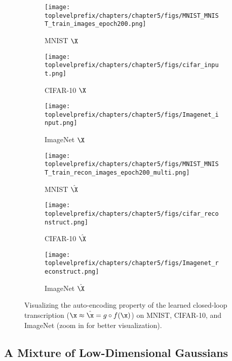 \documentclass[../../book-main.tex]{subfiles}
\begin{document}
\begin{figure}[t]
    \begin{subfigure}[t]{0.3\textwidth}
        \centering
        \texttt{[image: \\toplevelprefix/chapters/chapter5/figs/MNIST\_MNIST\_train\_images\_epoch200.png]}
        \caption{{\small MNIST $\X$}}
    \end{subfigure}
    \hfill
    \begin{subfigure}[t]{0.3\textwidth}
        \centering
        \texttt{[image: \\toplevelprefix/chapters/chapter5/figs/cifar\_input.png]}
        \caption{{\small CIFAR-10 $\X$}}
    \end{subfigure}
    \hfill
    \begin{subfigure}[t]{0.3\textwidth}
        \centering
        \texttt{[image: \\toplevelprefix/chapters/chapter5/figs/Imagenet\_input.png]}
        \caption{{\small ImageNet $\X$}}
    \end{subfigure}

    \begin{subfigure}[t]{0.3\textwidth}
        \centering
        \texttt{[image: \\toplevelprefix/chapters/chapter5/figs/MNIST\_MNIST\_train\_recon\_images\_epoch200\_multi.png]}
        \caption{{\small MNIST $\hat{\X}$}}
    \end{subfigure}
    \hfill
    \begin{subfigure}[t]{0.3\textwidth}
        \centering
        \texttt{[image: \\toplevelprefix/chapters/chapter5/figs/cifar\_reconstruct.png]}
        \caption{{\small CIFAR-10 $\hat{\X}$}}
    \end{subfigure}
    \hfill
    \begin{subfigure}[t]{0.3\textwidth}
        \centering
        \texttt{[image: \\toplevelprefix/chapters/chapter5/figs/Imagenet\_reconstruct.png]}
        \caption{{\small ImageNet $\hat{\X}$}}
    \end{subfigure}
    \caption{Visualizing the auto-encoding property of the learned closed-loop transcription \mbox{($\x \approx \hat{\x} = g\circ f(\x)$)} on MNIST, CIFAR-10, and ImageNet (zoom in for better visualization).}
    \label{fig:justify_xhat_equals_x}
\end{figure}
     

\subsection{A Mixture of Low-Dimensional Gaussians}
\end{document}

